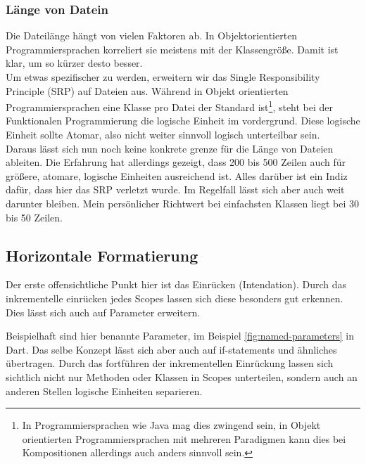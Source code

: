         \subsubsection{Länge von Datein}
            Die Dateilänge hängt von vielen Faktoren ab.
            In Objektorientierten Programmiersprachen korreliert sie meistens mit der Klassengröße.
            Damit ist klar, um so kürzer desto besser.\\
            Um etwas spezifischer zu werden, erweitern wir das Single Responsibility Principle (SRP) auf Dateien aus.
            Während in Objekt orientierten Programmiersprachen eine Klasse pro Datei der Standard ist\footnote{In Programmiersprachen wie Java mag dies zwingend sein, in Objekt orientierten Programmiersprachen mit mehreren Paradigmen kann dies bei Kompositionen allerdings auch anders sinnvoll sein.}, steht bei der Funktionalen Programmierung die logische Einheit im vordergrund.
            Diese logische Einheit sollte Atomar, also nicht weiter sinnvoll logisch unterteilbar sein.\\
            Daraus lässt sich nun noch keine konkrete grenze für die Länge von Dateien ableiten.
            Die Erfahrung hat allerdings gezeigt, dass 200 bis 500 Zeilen auch für größere, atomare, logische Einheiten ausreichend ist.
            Alles darüber ist ein Indiz dafür, dass hier das SRP verletzt wurde.
            Im Regelfall lässt sich aber auch weit darunter bleiben.
            Mein persönlicher Richtwert bei einfachsten Klassen liegt bei 30 bis 50 Zeilen.

    \subsection{Horizontale Formatierung}
        Der erste offensichtliche Punkt hier ist das Einrücken (Intendation).
        Durch das inkrementelle einrücken jedes Scopes lassen sich diese besonders gut erkennen.
        Dies lässt sich auch auf Parameter erweitern.
        
        Beispielhaft sind hier benannte Parameter, im Beispiel \ref{fig:named-parameters} in Dart.
        Das selbe Konzept lässt sich aber auch auf if-statements und ähnliches übertragen.
        Durch das fortführen der inkrementellen Einrückung lassen sich sichtlich nicht nur Methoden oder Klassen in Scopes unterteilen, sondern auch an anderen Stellen logische Einheiten separieren.
